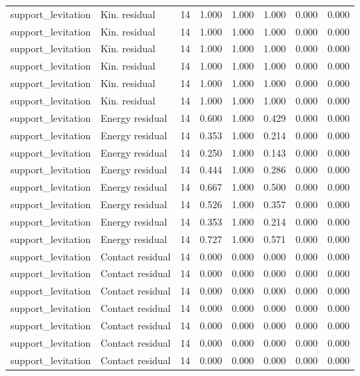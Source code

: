 {\begin{longtable}{llrrrrrr}
support\_levitation & Kin. residual & 14 & 1.000 & 1.000 & 1.000 & 0.000 & 0.000 \\
support\_levitation & Kin. residual & 14 & 1.000 & 1.000 & 1.000 & 0.000 & 0.000 \\
support\_levitation & Kin. residual & 14 & 1.000 & 1.000 & 1.000 & 0.000 & 0.000 \\
support\_levitation & Kin. residual & 14 & 1.000 & 1.000 & 1.000 & 0.000 & 0.000 \\
support\_levitation & Kin. residual & 14 & 1.000 & 1.000 & 1.000 & 0.000 & 0.000 \\
support\_levitation & Kin. residual & 14 & 1.000 & 1.000 & 1.000 & 0.000 & 0.000 \\
support\_levitation & Energy residual & 14 & 0.600 & 1.000 & 0.429 & 0.000 & 0.000 \\
support\_levitation & Energy residual & 14 & 0.353 & 1.000 & 0.214 & 0.000 & 0.000 \\
support\_levitation & Energy residual & 14 & 0.250 & 1.000 & 0.143 & 0.000 & 0.000 \\
support\_levitation & Energy residual & 14 & 0.444 & 1.000 & 0.286 & 0.000 & 0.000 \\
support\_levitation & Energy residual & 14 & 0.667 & 1.000 & 0.500 & 0.000 & 0.000 \\
support\_levitation & Energy residual & 14 & 0.526 & 1.000 & 0.357 & 0.000 & 0.000 \\
support\_levitation & Energy residual & 14 & 0.353 & 1.000 & 0.214 & 0.000 & 0.000 \\
support\_levitation & Energy residual & 14 & 0.727 & 1.000 & 0.571 & 0.000 & 0.000 \\
support\_levitation & Contact residual & 14 & 0.000 & 0.000 & 0.000 & 0.000 & 0.000 \\
support\_levitation & Contact residual & 14 & 0.000 & 0.000 & 0.000 & 0.000 & 0.000 \\
support\_levitation & Contact residual & 14 & 0.000 & 0.000 & 0.000 & 0.000 & 0.000 \\
support\_levitation & Contact residual & 14 & 0.000 & 0.000 & 0.000 & 0.000 & 0.000 \\
support\_levitation & Contact residual & 14 & 0.000 & 0.000 & 0.000 & 0.000 & 0.000 \\
support\_levitation & Contact residual & 14 & 0.000 & 0.000 & 0.000 & 0.000 & 0.000 \\
support\_levitation & Contact residual & 14 & 0.000 & 0.000 & 0.000 & 0.000 & 0.000 \\

\end{longtable}}
